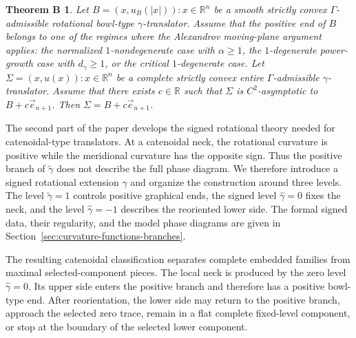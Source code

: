 \documentclass{amsart}
\theoremstyle{plain}
\theoremstyle{mainintrothm}
\newtheorem{maintheoremb}{Theorem B}
\theoremstyle{definition}
\begin{document}
\medskip

\begin{maintheoremb}
	Let $B={(x,u_B(|x|)):x\in\mathbb R^n}$ be a smooth strictly convex
	$\Gamma$-admissible rotational bowl-type $\gamma$-translator.  Assume that
	the positive end of $B$ belongs to one of the regimes where the Alexandrov
	moving-plane argument applies: the normalized $1$-nondegenerate case with
	$\alpha\ge1$, the $1$-degenerate power-growth case with $d_\gamma\ge1$, or
	the critical $1$-degenerate case.  Let
	$\Sigma={(x,u(x)):x\in\mathbb R^n}$ be a complete strictly convex entire
	$\Gamma$-admissible $\gamma$-translator.  Assume that there exists
	$c\in\mathbb R$ such that $\Sigma$ is $C^2$-asymptotic to
	$B+c\vec e_{n+1}$.  Then $\Sigma=B+c\vec e_{n+1}$.
\end{maintheoremb}

\medskip

The second part of the paper develops the signed rotational theory needed for
catenoidal-type translators.  At a catenoidal neck, the rotational curvature is
positive while the meridional curvature has the opposite sign.  Thus the positive
branch of $\widetilde\gamma$ does not describe the full phase diagram.  We
therefore introduce a signed rotational extension $\widehat\gamma$ and organize
the construction around three levels.  The level $\widetilde\gamma=1$ controls
positive graphical ends, the signed level $\widehat\gamma=0$ fixes the neck,
and the level $\widehat\gamma=-1$ describes the reoriented lower side.  The
formal signed data, their regularity, and the model phase diagrams are given in
Section~\ref{sec:curvature-functions-branches}. 

\medskip

The resulting catenoidal classification separates complete embedded families
from maximal selected-component pieces.  The local neck is produced by the
zero level $\widehat\gamma=0$.  Its upper side enters the positive branch and
therefore has a positive bowl-type end.  After reorientation, the lower side may
return to the positive branch, approach the selected zero trace, remain in a flat
complete fixed-level component, or stop at the boundary of the selected lower
component.

\medskip
\end{document}
